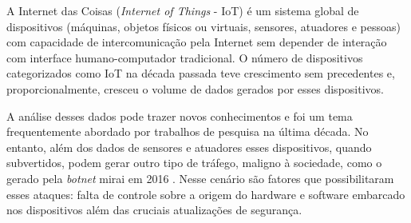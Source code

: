

% 
% 



A Internet das Coisas (\emph{Internet of Things} - IoT) é um sistema global de dispositivos
(máquinas, objetos físicos ou virtuais, sensores, atuadores e pessoas) com capacidade de intercomunicação pela Internet sem depender
de interação com interface humano-computador tradicional.
O número de dispositivos categorizados como IoT na década passada teve crescimento
sem precedentes e, proporcionalmente, cresceu o volume de  dados gerados por esses dispositivos.

A análise desses dados pode trazer novos conhecimentos e foi um tema frequentemente
abordado por trabalhos de pesquisa na última década.
No entanto, além dos
dados de sensores e atuadores esses dispositivos, quando subvertidos, podem
gerar outro tipo de tráfego, maligno à sociedade, como o gerado pela
\emph{botnet} mirai em 2016 \cite{Kambourakis2017}. Nesse cenário são fatores
que possibilitaram esses ataques: falta de controle sobre a origem do hardware e
software embarcado nos dispositivos além das cruciais atualizações de segurança.

